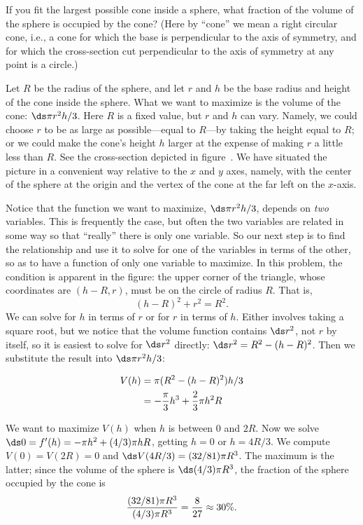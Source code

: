 \begin{example}
If you fit the largest possible cone inside a sphere, what fraction of the
volume of the sphere is occupied by the cone?  (Here by ``cone'' we mean a
right circular cone, i.e., a cone for which the base is perpendicular to
the axis of symmetry, and for which the cross-section cut perpendicular to
the axis of symmetry at any point is a circle.)


Let $R$ be the radius of the sphere, and let $r$ and $h$ be the base radius
and height of the cone inside the sphere.  What we want to maximize is the
volume of the cone: $\ds \pi r^2h/3$.  Here $R$ is a fixed value, but
$r$ and $h$ can vary.  Namely, we could choose $r$ to be as large as
possible---equal to $R$---by taking the height equal to $R$; or we
could make the cone's height $h$ larger at the expense of making $r$ a
little less than $R$.  See the cross-section depicted in
figure~. We
have situated the picture in a convenient way relative to the $x$ and
$y$ axes, namely, with the center of the sphere at the origin and the
vertex of the cone at the far left on the $x$-axis.

Notice that the function we want to maximize, $\ds \pi r^2h/3$,
depends on {\it two\/} variables.  This is frequently the case, but
often the two variables are related in some way so that ``really''
there is only one variable. So our next step is to
find the relationship and use it to solve for one of the variables in
terms of the other, so as to have a function of only one variable to
maximize.  In this problem, the condition is apparent in the figure:
the upper corner of the triangle, whose coordinates are $(h-R,r)$,
must be on the circle of radius $R$.  That is,
$$
      (h-R)^2+r^2=R^2.
$$ 
We can solve for $h$ in terms of $r$ or for $r$ in terms of $h$.
Either involves taking a square root, but we notice that the volume
function contains $\ds r^2$, not $r$ by itself, so it is easiest to solve
for $\ds r^2$ directly: $\ds r^2=R^2-(h-R)^2$.
Then we substitute the result into $\ds \pi r^2h/3$:

\begin{align*}
 V(h)&=\pi(R^2-(h-R)^2)h/3 \\
&=-{\pi\over3}h^3+{2\over3}\pi h^2R
\end{align*}
 
We want to maximize $V(h)$ when $h$ is between 0 and $2R$.  Now we
solve $\ds 0=f'(h)=-\pi h^2+(4/3)\pi h R$, getting $h=0$ or $h=4R/3$. 
We compute $V(0)=V(2R)=0$ and $\ds V(4R/3)=(32/81)\pi R^3$. The maximum is
the latter; since the volume of the sphere is $\ds (4/3)\pi R^3$, the
fraction of the sphere occupied by the cone is 
$${(32/81)\pi R^3\over (4/3)\pi R^3}={8\over 27}\approx 30\%.$$
\end{example}

